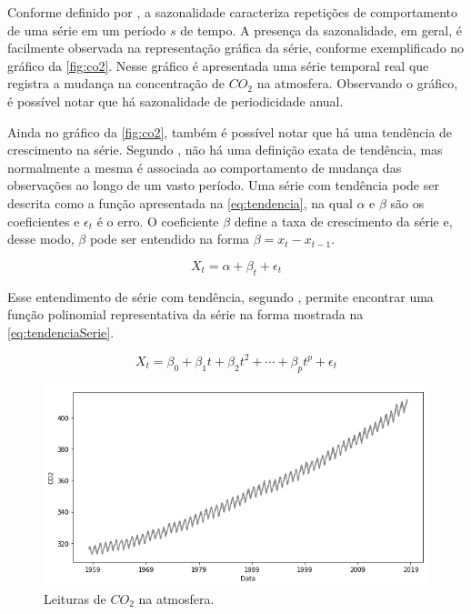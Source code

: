\documentclass[
    12pt,
    oneside,
    a4paper,
    english,
    brazil
]{abntex2}
\begin{document}
Conforme   definido  por   ,   a  sazonalidade   caracteriza
repetições de comportamento de uma série em um período $s$ de tempo. A presença
da sazonalidade, em  geral, é facilmente observada na  representação gráfica da
série, conforme exemplificado no gráfico  da \autoref{fig:co2}. Nesse gráfico é
apresentada uma série  temporal real que registra a mudança  na concentração de
$CO_2$ na atmosfera. Observando o gráfico, é possível notar que há sazonalidade
de periodicidade anual.

Ainda  no  gráfico  da  \autoref{fig:co2},  também  é  possível  notar  que  há
uma  tendência de  crescimento na  série. Segundo  , não  há
uma  definição exata  de  tendência, mas  normalmente a  mesma  é associada  ao
comportamento de mudança das observações ao longo de um vasto período.
Uma série com tendência pode ser descrita como a função
apresentada na \autoref{eq:tendencia}, na qual $\alpha$ e $\beta$ são os coeficientes %
e $\epsilon_t$ é o erro. O coeficiente $\beta$ define a taxa de crescimento da série e, desse modo, $\beta$ pode ser entendido na forma $\beta = x_t - x_{t-1}$.

\begin{equation}
    \label{eq:tendencia} X_t = \alpha + \beta_t + \epsilon_t
\end{equation}

Esse entendimento de série  com tendência, segundo , permite
encontrar uma  função polinomial representativa  da série na forma  mostrada na
\autoref{eq:tendenciaSerie}.

\begin{equation}
    \label{eq:tendenciaSerie}
    X_t = \beta_0 + \beta_1t + \beta_2t^2 + \cdots + \beta_{p}t^p + \epsilon_t
\end{equation}


\begin{figure}
    \centering
    \caption{Leituras de $CO_2$ na atmosfera.}\label{fig:co2}
    \includegraphics[width=.6\linewidth]{images/co2.png}
\end{figure}
\end{document}
